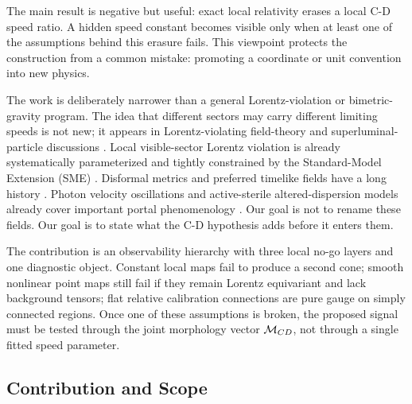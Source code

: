 \documentclass[11pt]{article}
\begin{document}
The main result is negative but useful: exact local relativity erases a local C-D speed ratio. A hidden speed constant becomes visible only when at least one of the assumptions behind this erasure fails. This viewpoint protects the construction from a common mistake: promoting a coordinate or unit convention into new physics.


The work is deliberately narrower than a general Lorentz-violation or bimetric-gravity program. The idea that different sectors may carry different limiting speeds is not new; it appears in Lorentz-violating field-theory and superluminal-particle discussions \citep{Redigolo2012LorentzViolatingSUSY,ChashchinaSilagadze2012LightSpeedBarrier}. Local visible-sector Lorentz violation is already systematically parameterized and tightly constrained by the Standard-Model Extension (SME) \citep{ColladayKostelecky1998SME,KosteleckyRussell2011DataTablesSME}. Disformal metrics and preferred timelike fields have a long history \citep{Bekenstein1993DisformalGeometry,Jacobson2008EinsteinAetherStatus}. Photon velocity oscillations and active-sterile altered-dispersion models already cover important portal phenomenology \citep{Glashow1998PhotonVelocityOscillations,DeAngelisPain2002PhotonVelocityOscillations,KosteleckyMewes2004Neutrinos,PaesPakvasaWeiler2005ShortcutSterile,HollenbergPaes2009ADRResonance,Barenboim2019SterileADRRevisited}. Our goal is not to rename these fields. Our goal is to state what the C-D hypothesis adds before it enters them.


The contribution is an observability hierarchy with three local no-go layers and one diagnostic object. Constant local maps fail to produce a second cone; smooth nonlinear point maps still fail if they remain Lorentz equivariant and lack background tensors; flat relative calibration connections are pure gauge on simply connected regions. Once one of these assumptions is broken, the proposed signal must be tested through the joint morphology vector \({\cal M}_{CD}\), not through a single fitted speed parameter.


\subsection{Contribution and Scope}
\end{document}
